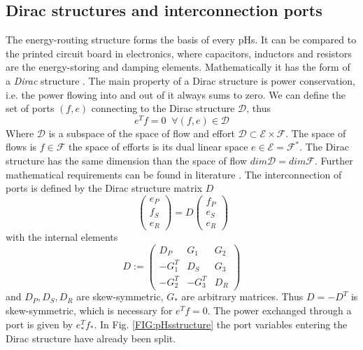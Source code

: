 \documentclass[a4paper,twoside, openright,12pt]{report}
\begin{document}
\subsection{Dirac structures and interconnection ports} \label{SS:PHSinterconnection}
The energy-routing structure forms the basis of every pHs. It can be compared to the printed circuit board in electronics, where capacitors, inductors and resistors are the energy-storing and damping elements. Mathematically it has the form of a \emph{Dirac} structure \cite{vanderSchaft_06}. The main property of a Dirac structure is power conservation, i.e. the power flowing into and out of it always sums to zero. We can define the set of ports $(f,e)$ connecting to the Dirac structure $\mathcal{D}$, thus 
\begin{equation}
e^Tf = 0 \;  \; \forall (f,e)\in\mathcal{D}
\end{equation}
Where $\mathcal{D}$ is a subspace of the space of flow and effort $\mathcal{D} \subset \mathcal{E}\times \mathcal{F}$. The space of flows is $f \in \mathcal{F}$ the space of efforts is its dual linear space $e \in \mathcal{E} = \mathcal{F}^*$. The Dirac structure has the same dimension than the space of flow $dim \mathcal{D} = dim \mathcal{F}$.
Further mathematical requirements can be found in literature \cite{vanderSchaft_06,Schaft_14}. The interconnection of ports is defined by the Dirac structure matrix $D$
\begin{equation}\
\begin{pmatrix}
e_P \\ f_S \\ e_R
\end{pmatrix} = D \begin{pmatrix}
f_P \\ e_S \\ e_R
\end{pmatrix}
\end{equation}
with the internal elements
\begin{equation}
D :=  \begin{pmatrix}
D_P & G_1 & G_2 \\ -G_1^T & D_S & G_3 \\ -G_2^T & -G_3^T & D_R 
\end{pmatrix}
\end{equation}
and $D_P,D_S,D_R$ are skew-symmetric, $G_*$ are arbitrary matrices. Thus $D = -D^T$ is skew-symmetric, which is necessary for $e^Tf=0$.
The power exchanged through a port is given by $ e_*^Tf_*$. In Fig. \ref{FIG:pHsstructure} the port variables entering the Dirac structure have already been split. 
\end{document}
